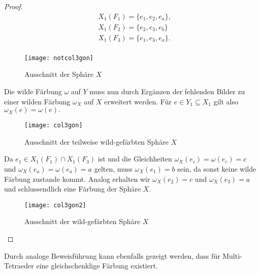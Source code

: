 \documentclass[12pt,titlepage,twoside,cleardoublepage]{article}
\numberwithin{equation}{section}
\begin{document}
\begin{proof}
\begin{align*}
&X_1(F_1)=\{e_1,e_2,e_a\},\\
&X_1(F_2)=\{e_2,e_3,e_b\}\\
& X_1(F_3)=\{e_1,e_3,e_a\}.\\
\end{align*}
\begin{figure}[H]
\begin{center}
\texttt{[image: notcol3gon]}
\end{center}
\caption{Ausschnitt der Sphäre $X$}
\end{figure}
Die wilde Färbung $\omega$ auf $Y$ muss nun durch Ergänzen der fehlenden Bilder zu einer wilden Färbung $\omega_X$ auf $X$ erweitert werden. Für $e\in Y_1\subseteq X_1$ gilt also $\omega_X(e)=\omega(e).$  
\begin{figure}[H]
\begin{center}
\texttt{[image: col3gon]}
\end{center}
\caption{Ausschnitt der teilweise wild-gefärbten Sphäre $X$}
\end{figure}
Da $e_1 \in X_1(F_1)\cap X_1(F_3)$ ist und die Gleichheiten $\omega_X(e_c)=\omega(e_c)=c$ und $\omega_X(e_a)=\omega(e_a)=a$ gelten, muss $\omega_X(e_1)=b$ sein, da sonst keine wilde Färbung zustande kommt. Analog erhalten wir $\omega_X(e_2)=c$ und $\omega_X(e_3)=a$ und schlussendlich eine Färbung der Sphäre $X$.
\begin{figure}[H]
\begin{center}
\texttt{[image: col3gon2]}
\end{center}
\caption{Ausschnitt der wild-gefärbten Sphäre $X$}
\end{figure}
\end{proof}
Durch analoge Beweisführung kann ebenfalls gezeigt werden, dass für Multi-Tetraeder eine gleichschenklige Färbung existiert. 
\end{document}
